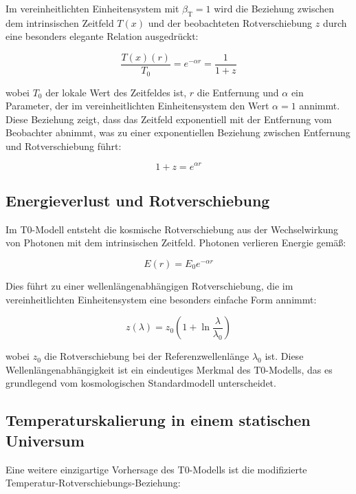 \documentclass[12pt,a4paper]{article}
\newcommand{\Tfield}{T(x)}
\newcommand{\Tzero}{T_0}
\newcommand{\betaT}{\beta_{\text{T}}}
\begin{document}
	Im vereinheitlichten Einheitensystem mit \(\betaT = 1\) wird die Beziehung zwischen dem intrinsischen Zeitfeld \(\Tfield\) und der beobachteten Rotverschiebung \(z\) durch eine besonders elegante Relation ausgedrückt:
	
	\begin{equation}
		\frac{\Tfield(r)}{\Tzero} = e^{-\alpha r} = \frac{1}{1+z}
	\end{equation}
	
	wobei \(\Tzero\) der lokale Wert des Zeitfeldes ist, \(r\) die Entfernung und \(\alpha\) ein Parameter, der im vereinheitlichten Einheitensystem den Wert \(\alpha = 1\) annimmt. Diese Beziehung zeigt, dass das Zeitfeld exponentiell mit der Entfernung vom Beobachter abnimmt, was zu einer exponentiellen Beziehung zwischen Entfernung und Rotverschiebung führt:
	
	\begin{equation}
		1 + z = e^{\alpha r}
	\end{equation}
	
	\subsection{Energieverlust und Rotverschiebung}
	Im T0-Modell entsteht die kosmische Rotverschiebung aus der Wechselwirkung von Photonen mit dem intrinsischen Zeitfeld. Photonen verlieren Energie gemäß:
	
	\begin{equation}
		E(r) = E_0 e^{-\alpha r}
	\end{equation}
	
	Dies führt zu einer wellenlängenabhängigen Rotverschiebung, die im vereinheitlichten Einheitensystem eine besonders einfache Form annimmt:
	
	\begin{equation}
		z(\lambda) = z_0 \left(1 + \ln \frac{\lambda}{\lambda_0}\right)
	\end{equation}
	
	wobei \(z_0\) die Rotverschiebung bei der Referenzwellenlänge \(\lambda_0\) ist. Diese Wellenlängenabhängigkeit ist ein eindeutiges Merkmal des T0-Modells, das es grundlegend vom kosmologischen Standardmodell unterscheidet.
	
	\subsection{Temperaturskalierung in einem statischen Universum}
	Eine weitere einzigartige Vorhersage des T0-Modells ist die modifizierte Temperatur-Rotverschiebungs-Beziehung:
	
\end{document}
